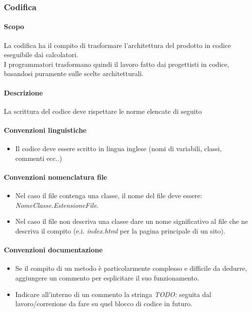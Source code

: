 \documentclass[a4paper, 12pt]{article}
\begin{document}
\subsubsection{Codifica}
\paragraph{Scopo}
La codifica ha il compito di trasformare l'architettura del prodotto in codice eseguibile dai calcolatori.\\
I programmatori trasformano quindi il lavoro fatto dai progettisti in codice, basandosi puramente sulle scelte architetturali.
\paragraph{Descrizione}
La scrittura del codice deve rispettare le norme elencate di seguito
\paragraph{Convenzioni linguistiche}
\begin{itemize}
	\item Il codice deve essere scritto in lingua inglese (nomi di variabili, classi, commenti ecc..)
\end{itemize}
\paragraph{Convenzioni nomenclatura file}
	\begin{itemize}
		\item Nel caso il file contenga una classe, il nome del file deve essere: \textit{NomeClasse.EstensioneFile}.
		\item Nel caso il file non descriva una classe dare un nome significativo al file che ne descriva il compito
		(e.i. \textit{index.html} per la pagina principale di un sito). 
	\end{itemize}
\paragraph{Convenzioni documentazione}
	\begin{itemize}
		\item Se il compito di un metodo è particolarmente complesso e difficile da dedurre, aggiungere un commento
		per esplicitare il suo funzionamento.
		\item Indicare all'interno di un commento la stringa \textit{TODO:} seguita dal lavoro/correzione da fare su quel 
		blocco di codice in futuro.
	\end{itemize}
\end{document}
